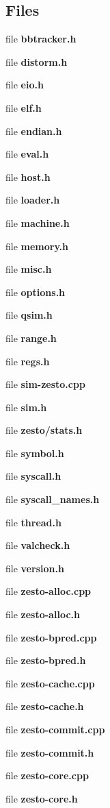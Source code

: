 \subsection*{Files}
\begin{CompactItemize}
\item 
file {\bf bbtracker.h}
\item 
file {\bf distorm.h}
\item 
file {\bf eio.h}
\item 
file {\bf elf.h}
\item 
file {\bf endian.h}
\item 
file {\bf eval.h}
\item 
file {\bf host.h}
\item 
file {\bf loader.h}
\item 
file {\bf machine.h}
\item 
file {\bf memory.h}
\item 
file {\bf misc.h}
\item 
file {\bf options.h}
\item 
file {\bf qsim.h}
\item 
file {\bf range.h}
\item 
file {\bf regs.h}
\item 
file {\bf sim-zesto.cpp}
\item 
file {\bf sim.h}
\item 
file {\bf zesto/stats.h}
\item 
file {\bf symbol.h}
\item 
file {\bf syscall.h}
\item 
file {\bf syscall\_\-names.h}
\item 
file {\bf thread.h}
\item 
file {\bf valcheck.h}
\item 
file {\bf version.h}
\item 
file {\bf zesto-alloc.cpp}
\item 
file {\bf zesto-alloc.h}
\item 
file {\bf zesto-bpred.cpp}
\item 
file {\bf zesto-bpred.h}
\item 
file {\bf zesto-cache.cpp}
\item 
file {\bf zesto-cache.h}
\item 
file {\bf zesto-commit.cpp}
\item 
file {\bf zesto-commit.h}
\item 
file {\bf zesto-core.cpp}
\item 
file {\bf zesto-core.h}
\item 

\end{CompactItemize}
